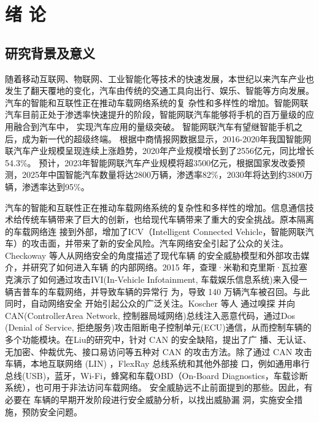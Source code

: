 \chapter{绪\hskip 0.4cm 论}
\label{ch1}
\section{研究背景及意义}
随着移动互联网、物联网、工业智能化等技术的快速发展，本世纪以来汽车产业也发生了翻天覆地的变化，汽车由传统的交通工具向出行、娱乐、智能等方向发展。汽车的智能和互联性正在推动车载网络系统的复
杂性和多样性的增加。智能网联汽车目前正处于渗透率快速提升的阶段，智能网联汽车能够将手机的百万量级的应用融合到汽车中，
实现汽车应用的量级突破。
智能网联汽车有望继智能手机之后，成为新一代的超级终端。
根据中商情报网数据显示\cite{zhao}，2016-2020年我国智能网联汽车产业规模呈现连续上涨趋势，2020年产业规模增长到了2556亿元，同比增长54.3\%。
预计，2023年智能网联汽车产业规模将超3500亿元，根据国家发改委预测\cite{siweicaijin}，2025年中国智能汽车数量将达2800万辆，渗透率82\%，2030年将达到约3800万辆，渗透率达到95\%。

汽车的智能和互联性正在推动车载网络系统的复杂性和多样性的增加。信息通信技术给传统车辆带来了巨大的创新，也给现代车辆带来了重大的安全挑战。原本隔离的车载网络连
接到外部，增加了ICV（Intelligent Connected Vehicle，智能网联汽车）的攻击面，并带来了新的安全风险。汽车网络安全引起了公众的关注。
Checkoway 等人\cite{checkoway2011comprehensive}从网络安全的角度描述了现代车辆
的安全威胁模型和外部攻击媒介，并研究了如何进入车辆
的内部网络。2015 年，查理·米勒和克里斯·瓦拉塞克演示了如何通过攻击IVI(In-Vehicle Infotainment, 车载娱乐信息系统)来入侵一辆吉普车的车载网络，并导致车辆的异常行
为，导致 140 万辆汽车被召回。与此同时，自动网络安全
开始引起公众的广泛关注\cite{miller2015remote}。Koscher 等人 \cite{koscher2010experimental} 通过嗅探
并向CAN(ControllerArea Network, 控制器局域网络)总线注入恶意代码，通过Dos
(Denial of Service, 拒绝服务)攻击阻断电子控制单元(ECU)通信，从而控制车辆的
多个功能模块。在Liu的研究\cite{liu2017vehicle}中，针对 CAN 的安全缺陷，提出了广
播、无认证、无加密、仲裁优先、接口易访问等五种对
CAN 的攻击方法。除了通过 CAN 攻击车辆，本地互联网络
(LIN) \cite{deng2017security}，FlexRay \cite{takahashi2017automotive} \cite{gu2016security} 总线系统和其他外部接
口，例如通用串行总线(USB)，蓝牙，Wi-Fi，蜂窝和车载OBD（On-Board Diagnostics，车载诊断系统），也可用于非法访问车载网络\cite{mousa2016lightweight}。
安全威胁远不止前面提到的那些。因此，有必要在
车辆的早期开发阶段进行安全威胁分析，以找出威胁漏
洞，实施安全措施，预防安全问题。

